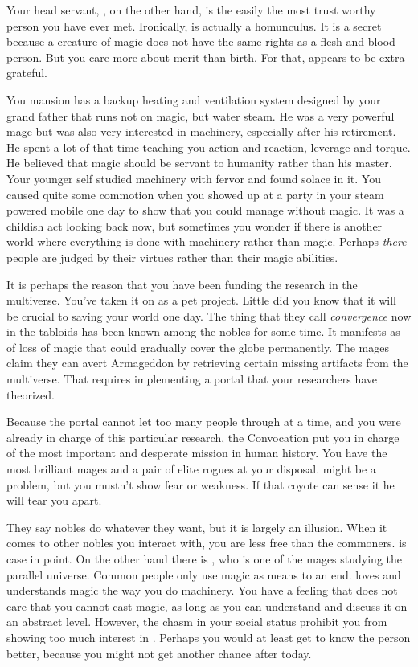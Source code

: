 \documentclass[char]{guildcamp3}
\begin{document}
Your head servant, \cServant{\intro}, on the other hand, is the easily the most trust worthy person you have ever met. Ironically,  is actually a homunculus. It is a secret because a creature of magic does not have the same rights as a flesh and blood person. But you care more about merit than birth. For that, \cServant{} appears to be extra grateful. 

You mansion has a backup heating and ventilation system designed by your grand father that runs not on magic, but water steam. He was a very powerful mage but was also very interested in machinery, especially after his retirement. He spent a lot of that time teaching you action and reaction, leverage and torque. He believed that magic should be servant to humanity rather than his master. Your younger self studied machinery with fervor and found solace in it. You caused quite some commotion when you showed up at a party in your steam powered mobile one day to show that you could manage without magic. It was a childish act looking back now, but sometimes you wonder if there is another world where everything is done with machinery rather than magic. Perhaps \emph{there} people are judged by their virtues rather than their magic abilities.

It is perhaps the reason that you have been funding the research in the multiverse. You've taken it on as a pet project. Little did you know that it will be crucial to saving your world one day. The thing that they call \emph{convergence} now in the tabloids has been known among the nobles for some time. It manifests as of loss of magic that could gradually cover the globe permanently. The mages claim they can avert Armageddon by retrieving certain missing artifacts from the multiverse. That requires implementing a portal that your researchers have theorized. 

Because the portal cannot let too many people through at a time, and you were already in charge of this particular research, the Convocation put you in charge of the most important and desperate mission in human history. You have the most brilliant mages and a pair of elite rogues at your disposal. \cNobleTwo{} might be a problem, but you mustn't show fear or weakness. If that coyote can sense it he will tear you apart. 

They say nobles do whatever they want, but it is largely an illusion. When it comes to other nobles you interact with, you are less free than the commoners. \cNobleTwo{} is case in point. On the other hand there is \cMageOne{\intro}, who is one of the mages studying the parallel universe. Common people only use magic as means to an end. \cMageOne{} loves and understands magic the way you do machinery. You have a feeling that  does not care that you cannot cast magic, as long as you can understand and discuss it on an abstract level. However, the chasm in your social status prohibit you from showing too much interest in \cMageOne{}. Perhaps you would at least get to know the person better, because you might not get another chance after today.
\end{document}
